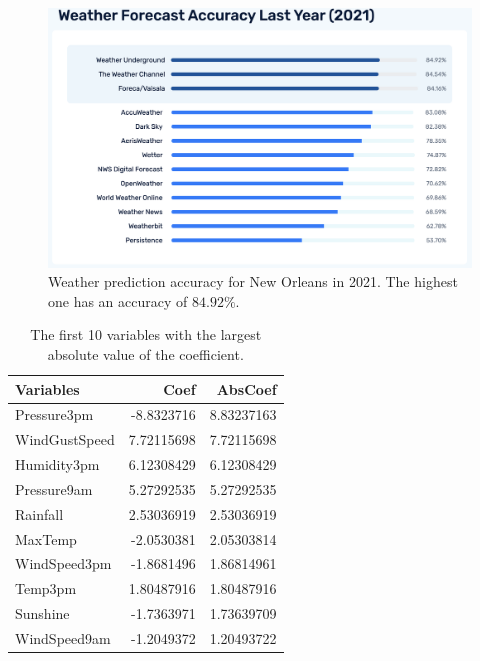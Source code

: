 \documentclass[11pt, a4paper, jou]{apa7}
\begin{document}
\begin{figure}[p]
    \centering
    \caption{Weather prediction accuracy for New Orleans in 2021. The highest one has an accuracy of $84.92\%$. }\label{fig:weather_prediction_nola}
    \includegraphics[width=.55\textwidth]{figures/Weather2021.png}
\end{figure}

\begin{table}[p]
\centering
\caption{The first 10 variables with the largest absolute value of the coefficient. }
\label{tab:rank_coef}
\begin{tabular}{lrr}
    \hline
    Variables     & Coef       & AbsCoef    \\ \hline
    Pressure3pm   & -8.8323716 & 8.83237163 \\
    WindGustSpeed & 7.72115698 & 7.72115698 \\
    Humidity3pm   & 6.12308429 & 6.12308429 \\
    Pressure9am   & 5.27292535 & 5.27292535 \\
    Rainfall      & 2.53036919 & 2.53036919 \\
    MaxTemp       & -2.0530381 & 2.05303814 \\
    WindSpeed3pm  & -1.8681496 & 1.86814961 \\
    Temp3pm       & 1.80487916 & 1.80487916 \\
    Sunshine      & -1.7363971 & 1.73639709 \\
    WindSpeed9am  & -1.2049372 & 1.20493722 \\ \hline
\end{tabular}
\end{table}
\end{document}
